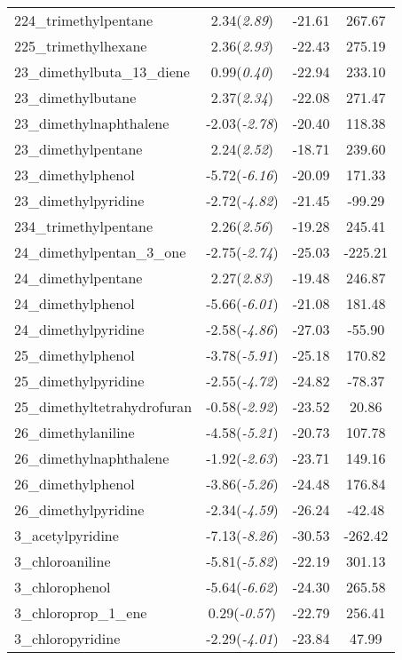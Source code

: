\documentclass{amsart}
\begin{document}
\begin{center}
\begin{longtable}{l|c|c|c}
224\_trimethylpentane & 2.34(\textit{2.89}) & -21.61 & 267.67 \\ 
225\_trimethylhexane & 2.36(\textit{2.93}) & -22.43 & 275.19 \\ 
23\_dimethylbuta\_13\_diene & 0.99(\textit{0.40}) & -22.94 & 233.10 \\ 
23\_dimethylbutane & 2.37(\textit{2.34}) & -22.08 & 271.47 \\ 
23\_dimethylnaphthalene & -2.03(\textit{-2.78}) & -20.40 & 118.38 \\ 
23\_dimethylpentane & 2.24(\textit{2.52}) & -18.71 & 239.60 \\ 
23\_dimethylphenol & -5.72(\textit{-6.16}) & -20.09 & 171.33 \\ 
23\_dimethylpyridine & -2.72(\textit{-4.82}) & -21.45 & -99.29 \\ 
234\_trimethylpentane & 2.26(\textit{2.56}) & -19.28 & 245.41 \\ 
24\_dimethylpentan\_3\_one & -2.75(\textit{-2.74}) & -25.03 & -225.21 \\ 
24\_dimethylpentane & 2.27(\textit{2.83}) & -19.48 & 246.87 \\ 
24\_dimethylphenol & -5.66(\textit{-6.01}) & -21.08 & 181.48 \\ 
24\_dimethylpyridine & -2.58(\textit{-4.86}) & -27.03 & -55.90 \\ 
25\_dimethylphenol & -3.78(\textit{-5.91}) & -25.18 & 170.82 \\ 
25\_dimethylpyridine & -2.55(\textit{-4.72}) & -24.82 & -78.37 \\ 
25\_dimethyltetrahydrofuran & -0.58(\textit{-2.92}) & -23.52 & 20.86 \\ 
26\_dimethylaniline & -4.58(\textit{-5.21}) & -20.73 & 107.78 \\ 
26\_dimethylnaphthalene & -1.92(\textit{-2.63}) & -23.71 & 149.16 \\ 
26\_dimethylphenol & -3.86(\textit{-5.26}) & -24.48 & 176.84 \\ 
26\_dimethylpyridine & -2.34(\textit{-4.59}) & -26.24 & -42.48 \\ 
3\_acetylpyridine & -7.13(\textit{-8.26}) & -30.53 & -262.42 \\ 
3\_chloroaniline & -5.81(\textit{-5.82}) & -22.19 & 301.13 \\ 
3\_chlorophenol & -5.64(\textit{-6.62}) & -24.30 & 265.58 \\ 
3\_chloroprop\_1\_ene & 0.29(\textit{-0.57}) & -22.79 & 256.41 \\ 
3\_chloropyridine & -2.29(\textit{-4.01}) & -23.84 & 47.99 \\ 

\end{longtable}
\end{center}
\end{document}
